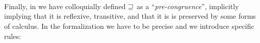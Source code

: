 \begin{AgdaAlign}
\begin{code}[hide]
\AgdaOperator{\AgdaFunction{,}}\AgdaSpace{}%
\AgdaSymbol{)}\AgdaSpace{}%
\<%
\\
%
\>[4]\AgdaSpace{}%
\AgdaSymbol{\AgdaUnderscore{}}\AgdaSpace{}%
\AgdaOperator{\AgdaInductiveConstructor{,}}\AgdaSpace{}%
\AgdaSpace{}%
\AgdaOperator{\AgdaInductiveConstructor{,}}\AgdaSpace{}%
\AgdaSpace{}%
\AgdaSymbol{=}\AgdaSpace{}%
\AgdaSpace{}%
\AgdaSpace{}%
\AgdaSpace{}%
\<%
\\
%
\>[4]\AgdaSpace{}%
\AgdaSpace{}%
\AgdaSpace{}%
\AgdaSymbol{(}\AgdaSpace{}%
\AgdaSymbol{(}\AgdaSpace{}%
\AgdaSymbol{)}\AgdaSpace{}%
\AgdaSymbol{)}\AgdaSpace{}%
\AgdaSpace{}%
\<%
\\
%
\>[4]\AgdaSpace{}%
\AgdaSpace{}%
\AgdaSymbol{(}\AgdaSpace{}%
\AgdaSpace{}%
\AgdaSymbol{(}\AgdaSpace{}%
\AgdaSymbol{(}\AgdaSpace{}%
\AgdaSymbol{))}\AgdaSpace{}%
\AgdaSymbol{(}\AgdaSpace{}%
\AgdaSpace{}%
\AgdaSymbol{)}\AgdaSpace{}%
\AgdaSymbol{)}\<%
\end{code}

Finally, in  we have colloquially defined $\sqsupseteq$ as a
``\emph{pre-congruence}'', implicitly implying that it is reflexive, transitive,
and that it is is preserved by some forms of calculus. In the formalization we
have to be precise and we introduce specific rules:


\end{AgdaAlign}
